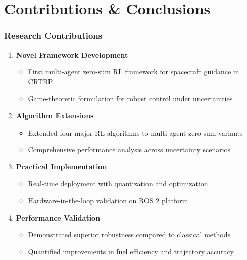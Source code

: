\documentclass[
    11pt, %
    aspectratio=169, %
]{beamer}
\begin{document}
\section{Contributions \& Conclusions}

\begin{frame}
	\frametitle{Research Contributions}
	
	\begin{enumerate}
		\item \textbf{Novel Framework Development}
		\begin{itemize}
			\item First multi-agent zero-sum RL framework for spacecraft guidance in CRTBP
			\item Game-theoretic formulation for robust control under uncertainties
		\end{itemize}
		
		\item \textbf{Algorithm Extensions}
		\begin{itemize}
			\item Extended four major RL algorithms to multi-agent zero-sum variants
			\item Comprehensive performance analysis across uncertainty scenarios
		\end{itemize}
		
		\item \textbf{Practical Implementation}
		\begin{itemize}
			\item Real-time deployment with quantization and optimization
			\item Hardware-in-the-loop validation on ROS 2 platform
		\end{itemize}
		
		\item \textbf{Performance Validation}
		\begin{itemize}
			\item Demonstrated superior robustness compared to classical methods
			\item Quantified improvements in fuel efficiency and trajectory accuracy
		\end{itemize}
	\end{enumerate}
\end{frame}
\end{document}
